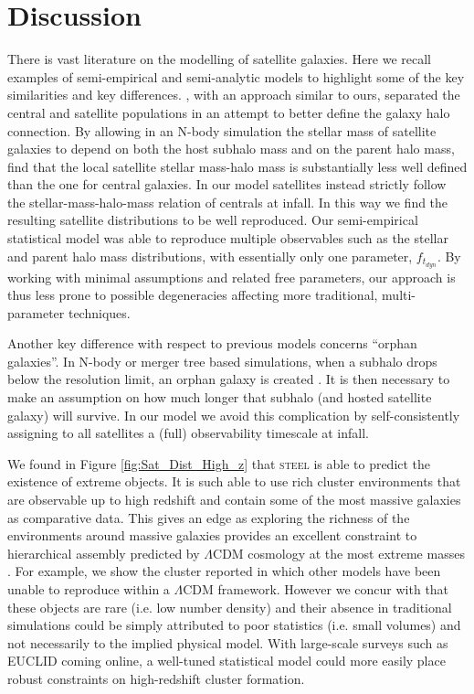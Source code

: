 \section{Discussion}

There is vast literature on the modelling of satellite galaxies. Here we recall examples of semi-empirical and semi-analytic models to highlight some of the key similarities and key differences. \citet{Neistein2013A2011}, with an approach similar to ours, separated the central and satellite populations in an attempt to better define the galaxy halo connection. By allowing in an N-body simulation the stellar mass of satellite galaxies to depend on both the host subhalo mass and on the parent halo mass, \citet{Neistein2013A2011} find that the local satellite stellar mass-halo mass is substantially less well defined than the one for central galaxies. In our model satellites instead strictly follow the stellar-mass-halo-mass relation of centrals at infall. In this way we find the resulting satellite distributions to be well reproduced. Our semi-empirical statistical model was able to reproduce multiple observables such as the stellar and parent halo mass distributions, with essentially only one parameter, $f_{t_{dyn}}$. By working with minimal assumptions and related free parameters, our approach is thus less prone to possible degeneracies affecting more traditional, multi-parameter techniques.

Another key difference with respect to previous models concerns ``orphan galaxies''. In N-body or merger tree based simulations, when a subhalo drops below the resolution limit, an orphan galaxy is created \citep[e.g.,][]{Guo2011FromCosmology, DeLucia2011TimesCosmology}. It is then necessary to make an assumption on how much longer that subhalo (and hosted satellite galaxy) will survive. In our model we avoid this complication by self-consistently assigning to all satellites a (full) observability timescale at infall.

 We found in Figure \ref{fig:Sat_Dist_High_z} that \textsc{steel} is able to predict the existence of extreme objects. It is such able to use rich cluster environments that are observable up to high redshift and contain some of the most massive galaxies as comparative data. This gives \steel an edge as exploring the richness of the environments around massive galaxies provides an excellent constraint to  hierarchical assembly predicted by $\Lambda$CDM cosmology at the most extreme masses \citep{Shankar2015}. For example, we show the cluster reported in \citet{Wang2016DISCOVERY2.506} which other models \cite[e.g.][]{Henriques2015GalaxyMasses} have been unable to reproduce within a $\Lambda$CDM framework. However we concur with \citet{Wang2016DISCOVERY2.506} that these objects are rare (i.e. low number density) and their absence in traditional simulations could be simply attributed to poor statistics (i.e. small volumes) and not necessarily to the implied physical model. With large-scale surveys such as EUCLID coming online, a well-tuned statistical model could more easily place robust constraints on high-redshift cluster formation. 
 
